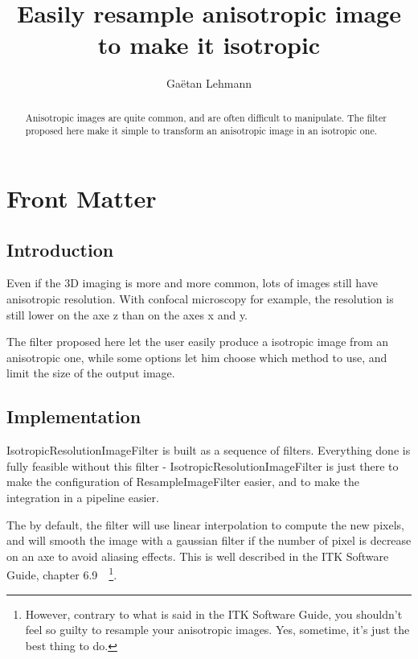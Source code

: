 \documentclass{InsightArticle}
\title{Easily resample anisotropic image to make it isotropic}
\author{Ga\"etan Lehmann}
\begin{document}
\maketitle

\ifhtml
\chapter*{Front Matter\label{front}}
\fi


\begin{abstract}
\noindent
Anisotropic images are quite common, and are often difficult to manipulate. The filter proposed here make it simple to transform an anisotropic image in an isotropic one.
\end{abstract}


\section{Introduction}

Even if the 3D imaging is more and more common, lots of images still have anisotropic resolution. With confocal microscopy for example, the resolution is still lower on the axe z than on the axes x and y.

The filter proposed here let the user easily produce a isotropic image from an anisotropic one, while some options let him choose which method to use, and limit the size of the output image.

\section{Implementation}

IsotropicResolutionImageFilter is built as a sequence of filters. Everything done is fully feasible without this filter - IsotropicResolutionImageFilter is just there to make the configuration of ResampleImageFilter easier, and to make the integration in a pipeline easier.

The by default, the filter will use linear interpolation to compute the new pixels, and will smooth the image with a gaussian filter if the number of pixel is decrease on an axe to avoid aliasing effects. This is well described in the ITK Software Guide, chapter 6.9~\cite{ITKSoftwareGuide}~\footnote{However, contrary to what is said in the ITK Software Guide, you shouldn't feel so guilty to resample your anisotropic images. Yes, sometime, it's just the best thing to do.}.
\end{document}

